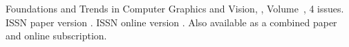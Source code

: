 \journallibraryinfo
 {%
  Foundations and Trends\textsuperscript{\textregistered} in
Computer Graphics and Vision, ,
  Volume~, 4 issues.
  ISSN paper version .
  ISSN online version .
  Also available as a combined paper and online
  subscription.
 } 